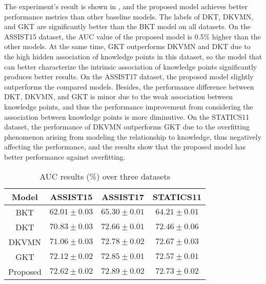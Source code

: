 The experiment's result is shown in \tblname{\ref{tbl:ch3-tb2}}, and the proposed model achieves better performance metrics than other baseline models. The labels of DKT, DKVMN, and GKT are significantly better than the BKT model on all datasets. On the ASSIST15 dataset, the AUC value of the proposed model is 0.5\% higher than the other models. At the same time, GKT outperforms DKVMN and DKT due to the high hidden association of knowledge points in this dataset, so the model that can better characterize the intrinsic association of knowledge points significantly produces better results. On the ASSIST17 dataset, the proposed model slightly outperforms the compared models. Besides, the performance difference between DKT, DKVMN, and GKT is minor due to the weak association between knowledge points, and thus the performance improvement from considering the association between knowledge points is more diminutive. On the STATICS11 dataset, the performance of DKVMN outperforms GKT due to the overfitting phenomenon arising from modeling the relationship to knowledge, thus negatively affecting the performance, and the results show that the proposed model has better performance against overfitting.

\begin{table}[htbp!]
    \centering
    \caption{AUC results (\%) over three datasets}\label{tbl:ch3-tb2}
    \begin{tabular}{cccc}
        \toprule
        Model    & ASSIST15                    & ASSIST17                   & STATICS11                  \\
        \midrule
        BKT      & \(62.01\pm 0.03 \)          & \(65.30\pm 0.01\)          & \(64.21\pm 0.01\)          \\
        DKT      & \(70.83\pm 0.03 \)          & \(72.66\pm 0.01\)          & \(72.46\pm 0.06\)          \\
        DKVMN    & \(71.06\pm 0.03 \)          & \(72.78\pm 0.02\)          & \(72.67\pm 0.03\)          \\
        GKT      & \(72.12\pm 0.02 \)          & \(72.85\pm 0.01\)          & \(72.57\pm 0.01\)          \\
        \midrule
        Proposed & \(\mathbf{72.62\pm 0.02} \) & \(\mathbf{72.89\pm 0.02}\) & \(\mathbf{72.73\pm 0.02}\) \\
        \bottomrule
    \end{tabular}
\end{table}
